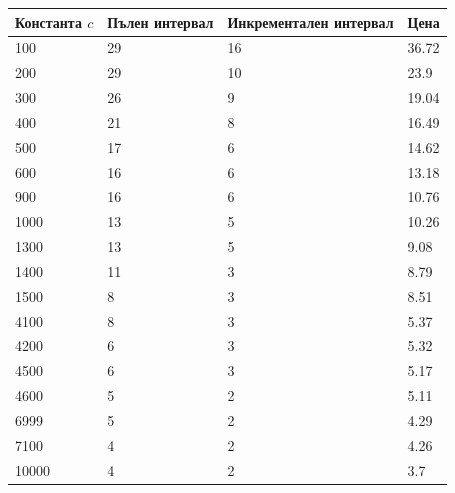 \documentclass[11pt, a4paper]{article}
\theoremstyle{definition}
\begin{document}
		\begin{center}\label{table_clean}
			\begin{tabular}{| l | l | l | l |}
				\hline
				Константа $c$ & Пълен интервал & Инкрементален интервал & Цена\\ \hline
				100 & 29 & 16 & 36.72\\ \hline
				200 & 29 & 10 & 23.9\\ \hline
				300 & 26 & 9 & 19.04\\ \hline
				400 & 21 & 8 & 16.49\\ \hline
				500 & 17 & 6 & 14.62\\ \hline
				600 & 16 & 6 & 13.18\\ \hline
				900 & 16 & 6 & 10.76\\ \hline
				1000 & 13 & 5 & 10.26\\ \hline
				1300 & 13 & 5 & 9.08\\ \hline
				1400 & 11 & 3 & 8.79\\ \hline
				1500 & 8 & 3 & 8.51\\ \hline
				4100 & 8 & 3 & 5.37\\ \hline
				4200 & 6 & 3 & 5.32\\ \hline
				4500 & 6 & 3 & 5.17\\ \hline
				4600 & 5 & 2 & 5.11\\ \hline
				6999 & 5 & 2 & 4.29\\ \hline
				7100 & 4 & 2 & 4.26\\ \hline
				10000 & 4 & 2 & 3.7\\ \hline
			\end{tabular}
		\end{center}
	
\end{document}
